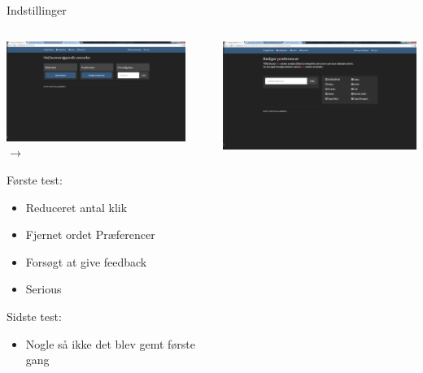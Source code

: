 \begin{frame}{Indstillinger}
	
	\begin{minipage}[0.3\textheight]{\textwidth}
	\begin{columns}[T]
	\begin{column}{0.5\textwidth}
	 \includegraphics[width=0.9\textwidth,height=0.9\textheight,keepaspectratio, trim={1cm 0 0 16mm}, clip]{images/Screenshots/SettingsOld.png} \vspace{2 mm} $\rightarrow$ 
	 
	 Første test:
	 \begin{itemize}
	 	\item Reduceret antal klik
	 	\item Fjernet ordet Præferencer
	 	\item Forsøgt at give feedback
	 	\item Serious
	 \end{itemize}
	 Sidste test:
	 \begin{itemize}
	 	\item Nogle så ikke det blev gemt første gang
	 \end{itemize}
	 
	\end{column}
	\begin{column}{0.5\textwidth}
	 \includegraphics[width=1\textwidth,height=1\textheight,keepaspectratio, trim={1cm 0 0 16mm}, clip]{images/Screenshots/SettingsOld2.png}
	 

\end{column}
\end{columns}
\end{minipage}
\end{frame}
